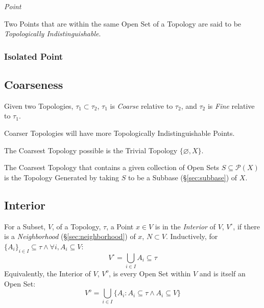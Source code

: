 \emph{Point}

Two Points that are within the same Open Set of a Topology are said to
be \emph{Topologically Indistinguishable}.



\subsubsection{Isolated Point}\label{sec:isolated_point}



\subsection{Coarseness}\label{sec:coarseness}

Given two Topologies, $\tau_1 \subset \tau_2$, $\tau_1$ is
\emph{Coarse} relative to $\tau_2$, and $\tau_2$ is \emph{Fine}
relative to $\tau_1$.

Coarser Topologies will have more Topologically Indistinguishable
Points.

The Coarsest Topology possible is the Trivial Topology $\{
\varnothing, X \}$.

The Coarsest Topology that contains a given collection of Open Sets $S
\subseteq \mathcal{P}(X)$ is the Topology Generated by taking $S$ to
be a Subbase (\S\ref{sec:subbase}) of $X$.



\subsection{Interior}\label{sec:interior}

For a Subset, $V$, of a Topology, $\tau$, a Point $x \in V$ is in the
\emph{Interior} of $V$, $V^{\circ}$, if there is a \emph{Neighborhood}
(\S\ref{sec:neighborhood}) of $x$, $N \subset V$. Inductively, for
$\{A_i\}_{i \in I} \subseteq \tau \wedge \forall i, A_i \subseteq V$:
\[
    V^{\circ} = \bigcup_{i \in I} A_i \subseteq \tau
\]
Equivalently, the Interior of $V$, $V^o$, is every Open Set within $V$
and is itself an Open Set:
\[
  V^o = \bigcup_{i \in I} \{ A_i : A_i \subseteq \tau \wedge A_i
  \subseteq V \}
\]



